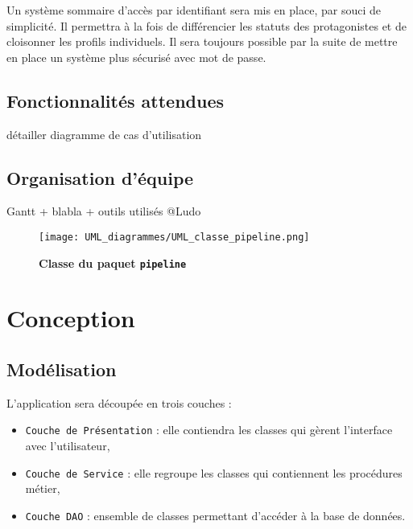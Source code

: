 \documentclass[11pt]{article}
\begin{document}
Un système sommaire d'accès par identifiant sera mis en place, par souci de simplicité. Il permettra à la fois de différencier les statuts des protagonistes et de cloisonner les profils individuels. Il sera toujours possible par la suite de mettre en place un système plus sécurisé avec mot de passe. \\



\subsection{Fonctionnalités attendues}

détailler diagramme de cas d'utilisation



\subsection{Organisation d'équipe}

Gantt + blabla + outils utilisés
@Ludo


\begin{figure}[H]
    \caption{\textbf{Classe du paquet \texttt{pipeline}}}
    \label{UML_classe_pipeline}
    \centering
    \texttt{[image: UML\_diagrammes/UML\_classe\_pipeline.png]}
\end{figure}








\newpage
\section{Conception}

\subsection{Modélisation}

L'application sera découpée en trois couches :
\begin{itemize}
    \item \texttt{Couche de Présentation} : elle contiendra les classes qui gèrent l'interface avec l'utilisateur,
    \item \texttt{Couche de Service} : elle regroupe les classes qui contiennent les procédures métier,
    \item \texttt{Couche DAO} : ensemble de classes permettant d'accéder à la base de données.
\end{itemize}
\end{document}
